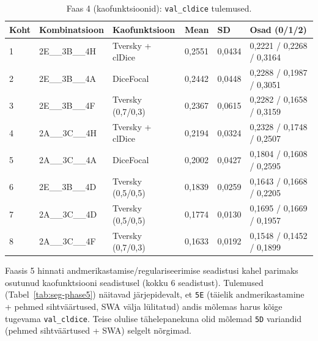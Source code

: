 \begin{table}[h!]
\centering
\caption{Faas 4 (kaofunktsioonid): \texttt{val\_cldice} tulemused.}
\label{tab:seg-phase4}
\begin{tabular}{llllll}
\hline
\textbf{Koht} & \textbf{Kombinatsioon} & \textbf{Kaofunktsioon} & \textbf{Mean} & \textbf{SD} & \textbf{Osad (0/1/2)} \\
\hline
1 & 2E\_\_3B\_\_4H & Tversky + clDice & 0,2551 & 0,0434 & 0,2221 / 0,2268 / 0,3164 \\
2 & 2E\_\_3B\_\_4A & DiceFocal        & 0,2442 & 0,0448 & 0,2288 / 0,1987 / 0,3051 \\
3 & 2E\_\_3B\_\_4F & Tversky (0,7/0,3)& 0,2367 & 0,0615 & 0,2282 / 0,1658 / 0,3159 \\
4 & 2A\_\_3C\_\_4H & Tversky + clDice & 0,2194 & 0,0324 & 0,2328 / 0,1748 / 0,2507 \\
5 & 2A\_\_3C\_\_4A & DiceFocal        & 0,2002 & 0,0427 & 0,1804 / 0,1608 / 0,2595 \\
6 & 2E\_\_3B\_\_4D & Tversky (0,5/0,5)& 0,1839 & 0,0259 & 0,1643 / 0,1668 / 0,2205 \\
7 & 2A\_\_3C\_\_4D & Tversky (0,5/0,5)& 0,1774 & 0,0130 & 0,1695 / 0,1669 / 0,1957 \\
8 & 2A\_\_3C\_\_4F & Tversky (0,7/0,3)& 0,1633 & 0,0192 & 0,1548 / 0,1452 / 0,1899 \\
\hline
\end{tabular}
\end{table}

Faasis 5 hinnati andmerikastamise/regulariseerimise seadistusi kahel parimaks osutunud kaofunktsiooni seadistusel (kokku 6 seadistust). Tulemused (Tabel~\ref{tab:seg-phase5}) näitavad järjepidevalt, et \texttt{5E} (täielik andmerikastamine + pehmed sihtväärtused, SWA välja lülitatud) andis mõlemas harus kõige tugevama \texttt{val\_cldice}. Teise olulise tähelepanekuna olid mõlemad \texttt{5D} variandid (pehmed sihtväärtused + SWA) selgelt nõrgimad.

